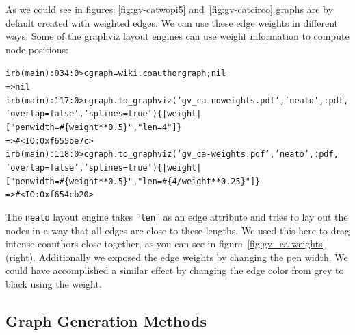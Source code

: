 \documentclass[a4paper]{scrartcl}
\newcounter{tcounter}
\newcommand{\tcount}{\makebox[0pt][r]{\tiny\thetcounter~}}
\newenvironment{typed}{\refstepcounter{tcounter}\bgroup\setlength{\topsep}{0pt}\renewcommand{\FrameCommand}[1]{\fcolorbox{black!30}{bgcolor}{##1}\tcount}\MakeFramed{\FrameRestore}\begin{alltt}\small}{\end{alltt}\endMakeFramed\egroup\par\aftergroup\noindent\aftergroup\ignorespaces}
\newcommand{\code}[1]{\texttt{\color{code}#1}}
\newcommand{\p}{\textcolor{prompt}}
\renewcommand{\c}{\textcolor{cmd}}
\begin{document}
As we could see in figures~\ref{fig:gv-catwopi5}
and~\ref{fig:gv-catcirco} graphs are by default created with weighted
edges. We can use these edge weights in different ways. Some of the
graphviz layout engines can use weight information to compute node
positions:
\begin{typed}
\p{irb(main):034:0>} \c{cgraph = wiki.coauthorgraph; nil}
=> nil
\p{irb(main):117:0>} \c{cgraph.to_graphviz('gv_ca-noweights.pdf', 'neato', :pdf,
                     'overlap=false', 'splines=true') \{ |weight| 
\hfill ["penwidth=#\{weight**0.5\}", "len=4"] \}}
=> #<IO:0xf655be7c>
\p{irb(main):118:0>} \c{cgraph.to_graphviz('gv_ca-weights.pdf', 'neato', :pdf,
                     'overlap=false', 'splines=true') \{ |weight| 
\hfill ["penwidth=#\{weight**0.5\}", "len=#\{4/weight**0.25\}"] \}}
=> #<IO:0xf654cb20>
\end{typed}
The \code{neato} layout engine takes ``\code{len}'' as an edge
attribute and tries to lay out the nodes in a way that all edges are
close to these lengths. We used this here to drag intense coauthors
close together, as you can see in figure~\ref{fig:gv_ca-weights} (right).
Additionally we exposed the edge weights by changing the pen
width. We could have accomplished a similar effect by changing the
edge color from grey to black using the weight.

\subsection{Graph Generation Methods}
\label{sec:graphmethods}
\end{document}
